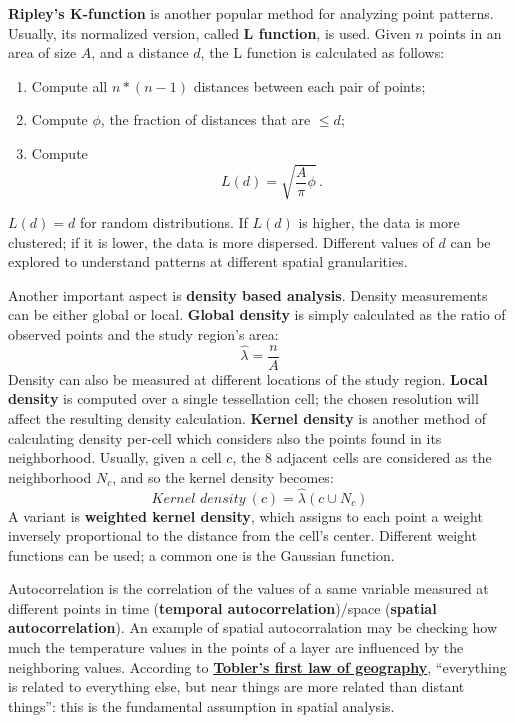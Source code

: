 \textbf{Ripley's K-function} is another popular method for analyzing point patterns. Usually, its normalized version, called \textbf{L function}, is used. Given $n$ points in an area of size $A$, and a distance $d$, the L function is calculated as follows:
\begin{enumerate}
    \item Compute all $n*(n-1)$ distances between each pair of points;
    \item Compute $\phi$, the fraction of distances that are $ \leq d$;
    \item Compute
    \begin{equation*}
        L(d) = \sqrt{\frac{A}{\pi} \phi} \,.
    \end{equation*}
\end{enumerate}
$L(d) = d$ for random distributions. If $L(d)$ is higher, the data is more clustered; if it is lower, the data is more dispersed. Different values of $d$ can be explored to understand patterns at different spatial granularities.

Another important aspect is \textbf{density based analysis}. Density measurements can be either global or local. \textbf{Global density} is simply calculated as the ratio of observed points and the study region's area:
\begin{equation*}
    \hat{\lambda} = \frac{n}{A}
\end{equation*}
Density can also be measured at different locations of the study region. \textbf{Local density} is computed over a single tessellation cell; the chosen resolution will affect the resulting density calculation. \textbf{Kernel density} is another method of calculating density per-cell which considers also the points found in its neighborhood. Usually, given a cell $c$, the 8 adjacent cells are considered as the neighborhood $N_c$, and so the kernel density becomes:
\begin{equation*}
    \textit{Kernel density} \ (c) = \hat{\lambda}(c \cup N_c)
\end{equation*}
A variant is \textbf{weighted kernel density}, which assigns to each point a weight inversely proportional to the distance from the cell's center. Different weight functions can be used; a common one is the Gaussian function.

Autocorrelation is the correlation of the values of a same variable measured at different points in time (\textbf{temporal autocorrelation})/space (\textbf{spatial autocorrelation}). An example of spatial autocorralation may be checking how much the temperature values in the points of a layer are influenced by the neighboring values. According to \href{https://en.wikipedia.org/wiki/Tobler%27s_first_law_of_geography}{\textbf{Tobler's first law of geography}}, ``everything is related to everything else, but near things are more related than distant things'': this is the fundamental assumption in spatial analysis.

